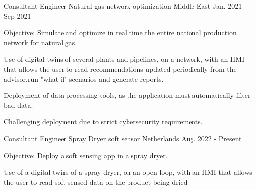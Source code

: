 

\begin{cventries}

  \cventry
    {Consultant Engineer} %
    {Natural gas network optimization} %
    {Middle East} %
    {Jan. 2021 - Sep 2021} %
    {
      \begin{cvitems} %
        \item {Objective: Simulate and optimize in real time the entire national production network for natural gas. }
        \item {Use of digital twins of several plants and pipelines, on a network, with an HMI that allows the user to read recommendations updated periodically from the advisor,run "what-if" scenarios and generate reports. }
        \item {Deployment of data processing tools, as the application must automatically filter bad data.}
        \item {Challenging deployment due to strict cybersecurity requirements.}
      \end{cvitems}
    }

  \cventry
    {Consultant Engineer} %
    {Spray Dryer soft sensor} %
    {Netherlands} %
    {Aug. 2022 - Present} %
    {
      \begin{cvitems} %
        \item {Objective: Deploy a soft sensing app  in a spray dryer. }
        \item {Use of a digital twins of a spray dryer, on an open loop, with an HMI that allows the user to read soft sensed data on the product being dried }
       \end{cvitems}
    }
    

\end{cventries}
